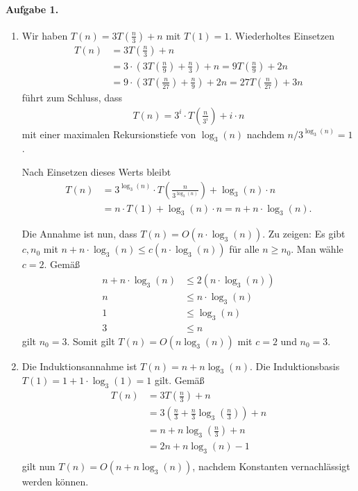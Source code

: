 \documentclass{article}
\begin{document}
\paragraph{Aufgabe 1.}

\begin{enumerate}
    \item Wir haben \(T(n) = 3T(\frac{n}{3}) + n\) mit \(T(1) = 1\). Wiederholtes Einsetzen
    \begin{align*}
        T(n) &= 3 T\left(\frac{n}{3}\right) + n \\
        &= 3 \cdot \left(3T\left(\frac{n}{9}\right) + \frac{n}{3}\right) + n =  9T\left(\frac{n}{9}\right) + 2n \\
        &= 9 \cdot \left(3T\left(\frac{n}{27}\right) + \frac{n}{9}\right) + 2n = 27T\left(\frac{n}{27}\right) + 3n
    \end{align*}
    führt zum Schluss, dass
    \begin{align*}
        T(n) = 3^i \cdot T\left(\frac{n}{3^i}\right) + i \cdot n
    \end{align*}
    mit einer maximalen Rekursionstiefe von \(\log_3(n)\) nachdem \(n / 3^{\log_3(n)} = 1\).

    Nach Einsetzen dieses Werts bleibt
    \begin{align*}
        T(n) &= 3^{\log_3(n)} \cdot T\left(\frac{n}{3^{\log_3(n)}}\right) + \log_3(n) \cdot n \\
        &= n \cdot T(1) + \log_3(n) \cdot n = n + n \cdot \log_3(n).
    \end{align*}

    Die Annahme ist nun, dass \(T(n) = O(n \cdot \log_3(n))\). Zu zeigen: Es gibt \(c, n_0\) mit \(n + n \cdot \log_3(n) \leq c(n \cdot \log_3(n))\) für alle \(n \geq n_0\). Man wähle \(c = 2\). Gemäß
    \begin{align*}
        n + n \cdot \log_3(n) &\leq 2(n \cdot \log_3(n)) \\
        n &\leq n \cdot \log_3(n) \\
        1 &\leq \log_3(n) \\
        3 &\leq n
    \end{align*}
    gilt \(n_0 = 3\). Somit gilt \(T(n) = O(n \log_3(n))\) mit $c = 2$ und $n_0 = 3$.

    \item Die Induktionsannahme ist \(T(n) = n + n\log_3(n)\). Die Induktionsbasis \(T(1) = 1 + 1 \cdot \log_3(1) = 1\) gilt. Gemäß
    \begin{align*}
        T(n) &= 3T\left(\frac{n}{3}\right) + n \\
        &= 3\left(\frac{n}{3} + \frac{n}{3}\log_3\left(\frac{n}{3}\right)\right) + n \\
        &= n + n \log_3\left(\frac{n}{3}\right) + n \\
        &= 2n + n \log_3(n) - 1 \\
    \end{align*}
    gilt nun $T(n) = O(n + n \log_3(n))$, nachdem Konstanten vernachlässigt werden können.
\end{enumerate}
\end{document}
